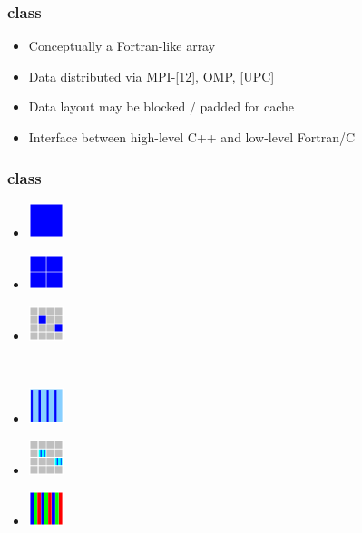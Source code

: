 
\begin{frame}
\frametitle{ class}

\begin{itemize}
\item Conceptually a Fortran-like array
\item Data distributed via MPI-[12], OMP, [UPC]
\item Data layout may be blocked / padded for cache
\item Interface between high-level C++ and low-level Fortran/C
\end{itemize}
\end{frame}

\begin{frame}
\frametitle{ class}

\begin{minipage}{1.8in}
\begin{itemize}
\item[]\includegraphics[width=0.4in]{array-serial.png} \ \ 
\item[]\includegraphics[width=0.4in]{array-block.png} \ \ 
\item[]\includegraphics[width=0.4in]{array-mpi.png} \ \ 
\end{itemize}
\end{minipage} \ 
\begin{minipage}{2in}
\begin{itemize}
\item[]\includegraphics[width=0.4in]{array-omp.png} \ \ 
\item[]\enhance{5-}\includegraphics[width=0.4in]{array-mpi-omp.png} \ \ 
\item[]\enhance{6-}\includegraphics[width=0.4in]{array-interleave.png} \ \ 
\end{itemize}
\end{minipage}

\end{frame}
